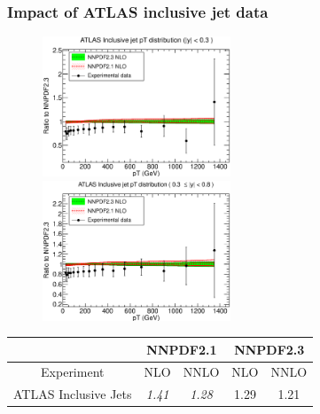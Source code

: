 \documentclass[10pt]{beamer}
\begin{document}
\begin{frame}
\frametitle{Impact of ATLAS inclusive jet data}
 \begin{figure}[b!]
    \begin{center}
      \includegraphics[width=0.50\textwidth]{ATLASR04JETS36PB_0}
      \includegraphics[width=0.50\textwidth]{ATLASR04JETS36PB_1}
    \end{center}
    \vskip-0.5cm
    \label{fig:pdf-jets}
\end{figure}
\begin{table}
\small
\begin{tabular}{|c||c|c||c|c|}
\hline 
& \multicolumn{2}{c||}{\bf NNPDF2.1} & \multicolumn{2}{|c|}{\bf NNPDF2.3}  \\
\hline 
\hline 
Experiment  & NLO & NNLO  & NLO  & NNLO  \\ 
\hline
ATLAS Inclusive Jets  & {\it 1.41} & {\it 1.28}  & 1.29  &  1.21   \\
\hline
\end{tabular}
\end{table}


\end{frame}
\end{document}
